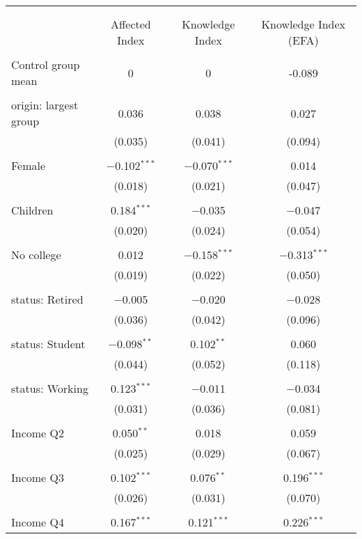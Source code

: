 
\begin{tabular}{@{\extracolsep{5pt}}lccc} 
\\[-1.8ex]\hline 
\hline \\[-1.8ex] 
\\[-1.8ex] & Affected Index & Knowledge Index & Knowledge Index (EFA) \\ 
\hline \\[-1.8ex] 
 Control group mean & 0 & 0 & -0.089  \\ \hline \\[-1.8ex] origin: largest group & 0.036 & 0.038 & 0.027 \\ 
  & (0.035) & (0.041) & (0.094) \\ 
  & & & \\ 
 Female & $-$0.102$^{***}$ & $-$0.070$^{***}$ & 0.014 \\ 
  & (0.018) & (0.021) & (0.047) \\ 
  & & & \\ 
 Children & 0.184$^{***}$ & $-$0.035 & $-$0.047 \\ 
  & (0.020) & (0.024) & (0.054) \\ 
  & & & \\ 
 No college & 0.012 & $-$0.158$^{***}$ & $-$0.313$^{***}$ \\ 
  & (0.019) & (0.022) & (0.050) \\ 
  & & & \\ 
 status: Retired & $-$0.005 & $-$0.020 & $-$0.028 \\ 
  & (0.036) & (0.042) & (0.096) \\ 
  & & & \\ 
 status: Student & $-$0.098$^{**}$ & 0.102$^{**}$ & 0.060 \\ 
  & (0.044) & (0.052) & (0.118) \\ 
  & & & \\ 
 status: Working & 0.123$^{***}$ & $-$0.011 & $-$0.034 \\ 
  & (0.031) & (0.036) & (0.081) \\ 
  & & & \\ 
 Income Q2 & 0.050$^{**}$ & 0.018 & 0.059 \\ 
  & (0.025) & (0.029) & (0.067) \\ 
  & & & \\ 
 Income Q3 & 0.102$^{***}$ & 0.076$^{**}$ & 0.196$^{***}$ \\ 
  & (0.026) & (0.031) & (0.070) \\ 
  & & & \\ 
 Income Q4 & 0.167$^{***}$ & 0.121$^{***}$ & 0.226$^{***}$ \\ 

\end{tabular}
